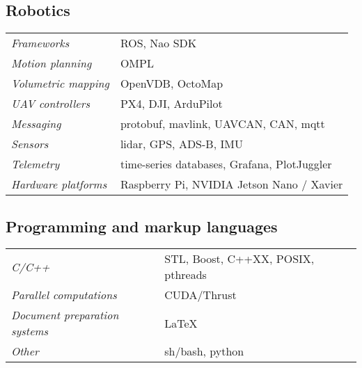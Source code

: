 \documentclass[a4paper,10pt]{report}
\begin{document}
\begin{adjustwidth}{0.5cm}{0pt}
\subsection{Robotics}
\begin{adjustwidth}{0.5cm}{0pt}
    \begin{tabularx}{\linewidth}{l X}
        {\it Frameworks}                    & ROS, Nao SDK \\
        {\it Motion planning}               & OMPL \\
        {\it Volumetric mapping}            & OpenVDB, OctoMap \\
        {\it UAV controllers}               & PX4, DJI, ArduPilot \\
        {\it Messaging}                     & protobuf, mavlink, UAVCAN, CAN, mqtt \\
        {\it Sensors}                       & lidar, GPS, ADS-B, IMU \\
        {\it Telemetry}                     & time-series databases, Grafana, PlotJuggler \\
        {\it Hardware platforms}            & Raspberry Pi, NVIDIA Jetson Nano / Xavier
    \end{tabularx}
\end{adjustwidth}

\subsection{Programming and markup languages}
\begin{adjustwidth}{0.5cm}{0pt}
    \begin{tabularx}{\linewidth}{l X}
        {\it C/C++}                         & STL, Boost, C++XX, POSIX, pthreads\\
        {\it Parallel computations}         & CUDA/Thrust\\
        {\it Document preparation systems}  & \LaTeX \\
        {\it Other}                         & sh/bash, python
    \end{tabularx}
\end{adjustwidth}


\end{adjustwidth}
\end{document}

